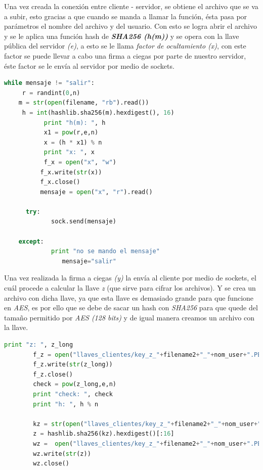 Una vez creada la conexión  entre cliente - servidor, se obtiene el archivo que se va a subir, esto gracias a que cuando se manda a llamar la función, ésta pasa por parámetros el nombre del archivo y del usuario. Con esto se logra abrir el archivo y se le aplica una función hash de \textbf{\textit{SHA256 (h(m))}} y se opera con la llave pública del servidor \textit{(e)}, a esto se le llama \textit{factor de ocultamiento (x)}, con este factor se puede llevar a cabo una firma a ciegas por parte de nuestro servidor, éste factor se le envía al servidor por medio de  sockets.

\begin{lstlisting}[language=Python,frame=single, keywordstyle=\color{blue},breaklines=true, showstringspaces=false]
 while mensaje != "salir":
	 r = randint(0,n)
	m = str(open(filename, "rb").read())
	 h = int(hashlib.sha256(m).hexdigest(), 16)
           print "h(m): ", h
           x1 = pow(r,e,n)
           x = (h * x1) % n
           print "x: ", x
           f_x = open("x", "w")
          f_x.write(str(x))
          f_x.close()
          mensaje = open("x", "r").read() 

	  try:
           	 sock.send(mensaje)

	except:
           	 print "no se mando el mensaje"
            	mensaje="salir"
\end{lstlisting}

Una vez realizada la firma a ciegas \textit{(y)} la envía al cliente por medio de sockets, el cuál procede a calcular la llave \textit{z} (que sirve para cifrar los archivos). Y se crea un archivo con dicha llave, ya que esta llave es demasiado grande para que funcione en \textit{AES}, es por ello que se debe de sacar un hash con \textit{SHA256} para que quede del tamaño permitido por \textit{AES (128 bits)} y de igual manera creamos un archivo con la llave.

\begin{lstlisting}[language=Python,frame=single, keywordstyle=\color{blue},breaklines=true, showstringspaces=false]
print "z: ", z_long
        f_z = open("llaves_clientes/key_z_"+filename2+"_"+nom_user+".PEM", "w")
        f_z.write(str(z_long))
        f_z.close()
        check = pow(z_long,e,n)
        print "check: ", check
        print "h: ", h % n

        kz = str(open("llaves_clientes/key_z_"+filename2+"_"+nom_user+".PEM", "rb").read())
        z = hashlib.sha256(kz).hexdigest()[:16]
        wz =  open("llaves_clientes/key_z_"+filename2+"_"+nom_user+".PEM", "w")
        wz.write(str(z))
        wz.close()
\end{lstlisting}

